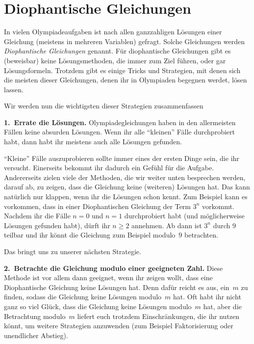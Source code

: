 \section{Diophantische Gleichungen}\label{kapitel:Diophantastisch}

In vielen Olympiadeaufgaben ist nach allen ganzzahligen Lösungen einer Gleichung (meistens in mehreren Variablen) gefragt. Solche Gleichungen werden \emph{Diophantische Gleichungen} genannt. Für diophantische Gleichungen gibt es (beweisbar) keine Lösungsmethoden, die immer zum Ziel führen, oder gar Lösungsformeln. Trotzdem gibt es einige Tricks und Strategien, mit denen sich die meisten dieser Gleichungen, denen ihr in Olympiaden begegnen werdet, lösen lassen.

Wir werden nun die wichtigsten dieser Strategien zusammenfassen

\textbf{1.~Errate die Lösungen.} Olympiadegleichungen haben in den allermeisten Fällen keine absurden Lösungen. Wenn ihr alle \enquote{kleinen} Fälle durchprobiert habt, dann habt ihr meistens auch alle Lösungen gefunden.

\enquote{Kleine} Fälle auszuprobieren sollte immer eines der ersten Dinge sein, die ihr versucht. Einerseits bekommt ihr dadurch ein Gefühl für die Aufgabe. Andererseits zielen viele der Methoden, die wir weiter unten besprechen werden, darauf ab, zu zeigen, dass die Gleichung keine (weiteren) Lösungen hat. Das kann natürlich nur klappen, wenn ihr die Lösungen schon kennt. Zum Beispiel kann es vorkommen, dass in einer Diophantischen Gleichung der Term $3^n$ vorkommt. Nachdem ihr die Fälle $n=0$ und $n=1$ durchprobiert habt (und möglicherweise Lösungen gefunden habt), dürft ihr $n\geqslant 2$ annehmen. Ab dann ist $3^n$ durch $9$ teilbar und ihr könnt die Gleichung zum Beispiel modulo~$9$ betrachten.

Das bringt uns zu unserer nächsten Strategie.

\textbf{2.~Betrachte die Gleichung modulo einer geeigneten Zahl.} Diese Methode ist vor allem dann geeignet, wenn ihr zeigen wollt, dass eine Diophantische Gleichung keine Lösungen hat. Denn dafür reicht es aus, ein~$m$ zu finden, sodass die Gleichung keine Lösungen modulo~$m$ hat. Oft habt ihr nicht ganz so viel Glück, dass die Gleichung keine Lösungen modulo~$m$ hat, aber die Betrachtung modulo~$m$ liefert euch trotzdem Einschränkungen, die ihr nutzen könnt, um weitere Strategien anzuwenden (zum Beispiel Faktorisierung oder unendlicher Abstieg).

